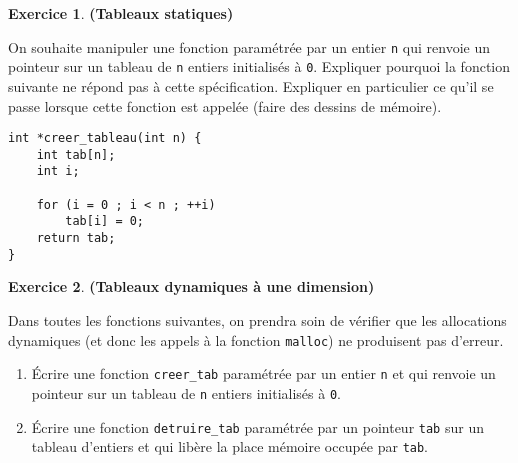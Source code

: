 \documentclass[12pt]{article}
\theoremstyle{definition}
\newtheorem{Exercice}{Exercice}
\begin{document}
\begin{Exercice} {\bf (Tableaux statiques)}\smallskip

On souhaite manipuler une fonction paramétrée par un entier {\tt n} qui
renvoie un pointeur sur un tableau de {\tt n} entiers initialisés à {\tt 0}.
Expliquer pourquoi la fonction suivante ne répond pas à cette spécification.
Expliquer en particulier ce qu'il se passe lorsque cette fonction est
appelée (faire des dessins de mémoire).
\begin{lstlisting}
int *creer_tableau(int n) {
    int tab[n];
    int i;

    for (i = 0 ; i < n ; ++i)
        tab[i] = 0;
    return tab;
}
\end{lstlisting}
\end{Exercice}
\bigskip

\begin{Exercice} {\bf (Tableaux dynamiques à une dimension)}\smallskip

Dans toutes les fonctions suivantes, on prendra soin de vérifier que
les allocations dynamiques (et donc les appels à la fonction {\tt malloc})
ne produisent pas d'erreur.
\begin{enumerate}
    \item Écrire une fonction {\tt creer\_tab} paramétrée par un entier
    {\tt n} et qui renvoie un pointeur sur un tableau de {\tt n} entiers
    initialisés à {\tt 0}.
    \smallskip

    \item Écrire une fonction {\tt detruire\_tab} paramétrée par un
    pointeur {\tt tab} sur un tableau d'entiers et qui libère la place
    mémoire occupée par {\tt tab}.
\end{enumerate}
\end{Exercice}
\bigskip
\end{document}
